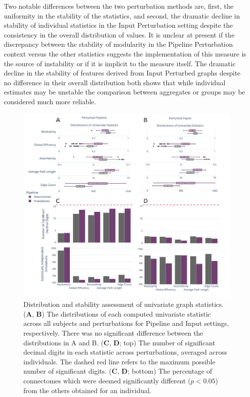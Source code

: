 \documentclass[fleqn,10pt]{SelfArx} %
\begin{document}
Two notable differences between the two perturbation methods are, first, the uniformity in the stability of the
statistics, and second, the dramatic decline in stability of individual statistics in the Input Perturbation setting
despite the consistency in the overall distribution of values. It is unclear at present if the discrepancy between the
stability of modularity in the Pipeline Perturbation context versus the other statistics suggests the implementation of
this measure is the source of instability or if it is implicit to the measure itself. The dramatic decline in the
stability of features derived from Input Perturbed graphs despite no difference in their overall distribution both
shows that while individual estimates may be unstable the comparison between aggregates or groups may be considered
much more reliable.

\begin{figure}[ht]\centering
\includegraphics[width=\linewidth]{figures/figS2_univariate_differences.pdf}
\caption{Distribution and stability assessment of univariate graph statistics. (\textbf{A}, \textbf{B}) The
distributions of each computed univariate statistic across all subjects and perturbations for Pipeline and Input
settings, respectively. There was no significant difference between the distributions in A and B. (\textbf{C},
\textbf{D}; top) The number of significant decimal digits in each statistic across perturbations, averaged across
individuals. The dashed red line refers to the maximum possible number of significant digits.
(\textbf{C}, \textbf{D}; bottom) The percentage of connectomes which were deemed significantly different
($p < 0.05$) from the others obtained for an individual.}
\label{sfig:univariate}
\end{figure}
\end{document}
